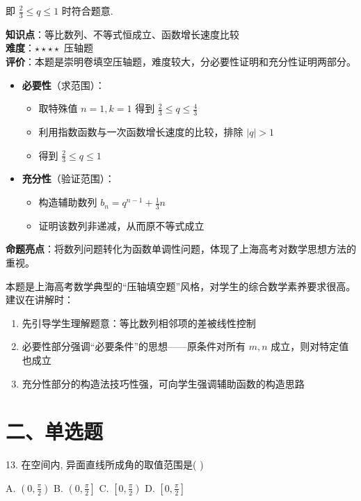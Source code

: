 \documentclass[10pt]{article}
\begin{document}
即 \(\frac{2}{3} \leq  q \leq  1\) 时符合题意.

\begin{analysisbox}[考点分析]
\textbf{知识点}：等比数列、不等式恒成立、函数增长速度比较\\
\textbf{难度}：\(\star\star\star\star\) 压轴题\\
\textbf{评价}：本题是崇明卷填空压轴题，难度较大，分必要性证明和充分性证明两部分。
\begin{itemize}
\item \textbf{必要性}（求范围）：
  \begin{itemize}
  \item 取特殊值 \(n=1, k=1\) 得到 \(\frac{2}{3} \leq q \leq \frac{4}{3}\)
  \item 利用指数函数与一次函数增长速度的比较，排除 \(|q| > 1\)
  \item 得到 \(\frac{2}{3} \leq q \leq 1\)
  \end{itemize}
\item \textbf{充分性}（验证范围）：
  \begin{itemize}
  \item 构造辅助数列 \({b}_{n} = {q}^{n - 1} + \frac{1}{3}n\)
  \item 证明该数列非递减，从而原不等式成立
  \end{itemize}
\end{itemize}
\textbf{命题亮点}：将数列问题转化为函数单调性问题，体现了上海高考对数学思想方法的重视。
\end{analysisbox}

\begin{tipbox}[教学提示]
本题是上海高考数学典型的``压轴填空题''风格，对学生的综合数学素养要求很高。建议在讲解时：
\begin{enumerate}
\item 先引导学生理解题意：等比数列相邻项的差被线性控制
\item 必要性部分强调``必要条件''的思想——原条件对所有 \(m,n\) 成立，则对特定值也成立
\item 充分性部分的构造法技巧性强，可向学生强调辅助函数的构造思路
\end{enumerate}
\end{tipbox}

\section*{二、单选题}

13. 在空间内, 异面直线所成角的取值范围是( )

A. \(\left( {0,\frac{\pi }{2}}\right)\) B. \(\left( {0,\frac{\pi }{2}}\right\rbrack\) C. \(\left\lbrack  {0,\frac{\pi }{2}}\right)\) D. \(\left\lbrack  {0,\frac{\pi }{2}}\right\rbrack\)
\end{document}
